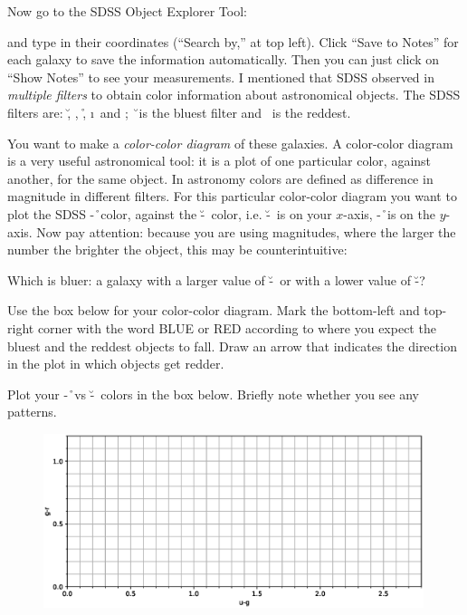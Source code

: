 \noindent Now go to the SDSS Object Explorer Tool:


\noindent and type in their coordinates (``Search by,'' at top
left). Click ``Save to Notes'' for each galaxy to save the information
automatically. Then you can just click on ``Show Notes'' to see your
measurements.  I mentioned that SDSS observed in \emph{multiple
filters} to obtain color information about astronomical objects. The
SDSS filters are: \u, \g, \r, \i \ and \z; \u \ is the bluest filter
and \z \ is the reddest.

\noindent 
You want to make a \emph{color-color diagram} of these galaxies. A
color-color diagram is a very useful astronomical tool: it is a plot
of one particular color, against another, for the same object.  In
astronomy colors are defined as difference in magnitude in different
filters. For this particular color-color diagram you want to plot the
SDSS \g-\r \ color, against the \u-\g \ color, i.e. \u-\g \ is on your
$x$-axis, \g-\r \ is on the $y$-axis. Now pay attention: because you
are using magnitudes, where the larger the number the brighter the
object, this may be counterintuitive:

 Which is bluer: a galaxy with a larger value of \u-\g \ or with a lower value of \u-\g?

\noindent 
Use the box below for your color-color diagram. Mark the bottom-left
and top-right corner with the word BLUE or RED according to where you
expect the bluest and the reddest objects to fall. Draw an arrow that
indicates the direction in the plot in which objects get redder.

\noindent
Plot your \g-\r \ vs \u-\g \ colors in the box below. Briefly note
whether you see any patterns.


\begin{figure}[b!]
\includegraphics[width=0.99\textwidth]{colorcolor.eps}
\end{figure}

